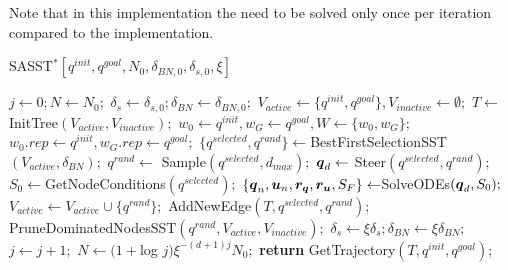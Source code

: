 Note that in this implementation the  need to be solved only once per iteration compared to the  implementation.

\begin{algorithm}[htp]
    \caption{SASST$^* [q^{init}, q^{goal}, N_0, \delta_{BN,0}, \delta_{s,0}, \xi]$}\label{alg:SASST*}
    \begin{algorithmic}[1]
        \State $j \gets 0; N \gets N_0;$
        \State $\delta_{s} \gets \delta_{s,0}; \delta_{BN} \gets \delta_{BN,0};$
        \State $V_{active} \gets \{q^{init}, q^{goal}\}, V_{inactive} \gets \emptyset;$
        \State $T \gets$ InitTree$(V_{active}, V_{inactive});$
        \State $w_0 \gets q^{init}, w_G \gets q^{goal}, W \gets \{w_0, w_G\};$
        \State $w_0.rep \gets q^{init}, w_G.rep \gets q^{goal};$
                \State $\{q^{selected}, q^{rand}\} \gets $BestFirstSelectionSST$(V_{active}, \delta_{BN});$
                \State $q^{rand} \gets$ Sample$(q^{selected}, d_{max});$
                \State $\boldsymbol{q}_d \gets$ Steer$({q^{selected}},{q^{rand}});$
                \State $S_0 \gets $GetNodeConditions$({q^{selected}});$
                \State $\left \{\boldsymbol{q}_n, \boldsymbol{u}_n, \boldsymbol{r_q}, \boldsymbol{r_u}, S_F \right \}  \gets $SolveODEs$(\boldsymbol{q}_d, S_0);$
                        \State $V_{active} \gets V_{active} \cup \{q^{rand}\};$
                        \State AddNewEdge$(T, q^{selected}, q^{rand});$
                        \State PruneDominatedNodesSST$(q^{rand}, V_{active}, V_{inactive});$
                    \EndIf
                \EndIf
            \EndFor
            \State $\delta_s \gets \xi\delta_s; \delta_{BN}\gets\xi\delta_{BN};$
            \State $j \gets j+1;$
            \State $N \gets (1+$log $j)\xi^{-(d+1)j}N_0;$
        \EndWhile
        \State \textbf{return} GetTrajectory$(T, q^{init}, q^{goal})$;
    \end{algorithmic}
\end{algorithm}



